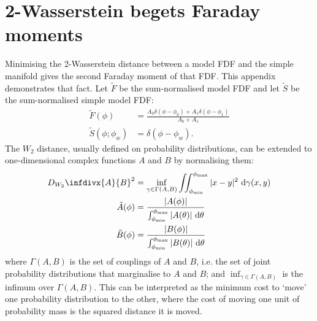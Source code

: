 \section{2-Wasserstein begets Faraday moments}
  \label{sec:faraday-w2-to-faraday-moments}
    Minimising the 2-Wasserstein distance between a model FDF and the simple manifold gives the second Faraday moment of that FDF. This appendix demonstrates that fact. Let $\tilde F$ be the sum-normalised model FDF and let $\tilde S$ be the sum-normalised simple model FDF:
    \begin{align}
      \tilde F(\phi) &= \frac{A_0 \delta(\phi - \phi_0) + A_1 \delta(\phi - \phi_1)}{A_0 + A_1}\\
      \tilde S(\phi; \phi_w) &= \delta(\phi - \phi_w).
    \end{align}
    The $W_2$ distance, usually defined on probability distributions, can be extended to one-dimensional complex functions $A$ and $B$ by normalising them:
      \begin{align}
        \label{eq:faraday-w2}
        D_{W_2}\infdivx{A}{B}^2 &= \inf_{\gamma \in \Gamma(A, B)} \iint_{\phi_{\min}}^{\phi_{\max}} |x - y|^2\ \mathrm{d}\gamma(x, y) \\
        \label{eq:faraday-normalised}
        \tilde A(\phi) &= \frac{|A(\phi)|}{\int_{\phi_{\min}}^{\phi_{\max}} |A(\theta)|\ \mathrm{d}\theta}\\
        \tilde B(\phi) &= \frac{|B(\phi)|}{\int_{\phi_{\min}}^{\phi_{\max}} |B(\theta)|\ \mathrm{d}\theta}
      \end{align}
      where $\Gamma(A, B)$ is the set of couplings of $A$ and $B$, i.e. the set of joint probability distributions that marginalise to $A$ and $B$; and $\inf_{\gamma \in \Gamma(A, B)}$ is the infimum over $\Gamma(A, B)$. This can be interpreted as the minimum cost to `move' one probability distribution to the other, where the cost of moving one unit of probability mass is the squared distance it is moved.

